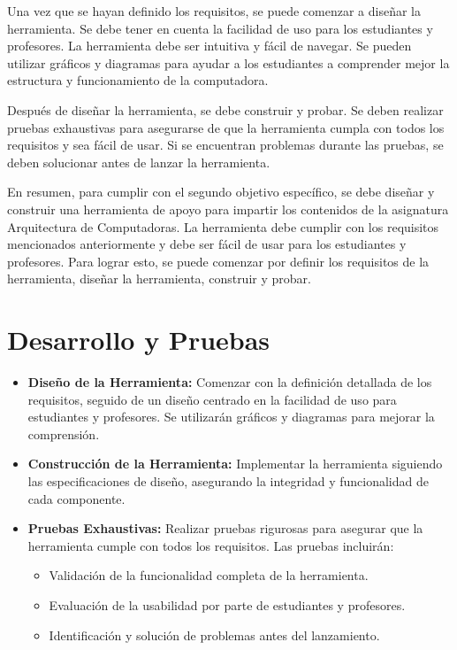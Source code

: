 \documentclass[12pt,twoside]{templates/unerthesis}
\providecommand{\tightlist}{%
  \setlength{\itemsep}{0pt}\setlength{\parskip}{0pt}}
\begin{document}
Una vez que se hayan definido los requisitos, se puede comenzar a diseñar la herramienta. Se debe tener en cuenta la facilidad de uso para los estudiantes y profesores. La herramienta debe ser intuitiva y fácil de navegar. Se pueden utilizar gráficos y diagramas para ayudar a los estudiantes a comprender mejor la estructura y funcionamiento de la computadora.

Después de diseñar la herramienta, se debe construir y probar. Se deben realizar pruebas exhaustivas para asegurarse de que la herramienta cumpla con todos los requisitos y sea fácil de usar. Si se encuentran problemas durante las pruebas, se deben solucionar antes de lanzar la herramienta.

En resumen, para cumplir con el segundo objetivo específico, se debe diseñar y construir una herramienta de apoyo para impartir los contenidos de la asignatura Arquitectura de Computadoras. La herramienta debe cumplir con los requisitos mencionados anteriormente y debe ser fácil de usar para los estudiantes y profesores. Para lograr esto, se puede comenzar por definir los requisitos de la herramienta, diseñar la herramienta, construir y probar.

\hypertarget{desarrollo-y-pruebas}{%
\section{Desarrollo y Pruebas}\label{desarrollo-y-pruebas}}

\begin{itemize}
\item
  \textbf{Diseño de la Herramienta:} Comenzar con la definición detallada de los requisitos, seguido de un diseño centrado en la facilidad de uso para estudiantes y profesores. Se utilizarán gráficos y diagramas para mejorar la comprensión.
\item
  \textbf{Construcción de la Herramienta:} Implementar la herramienta siguiendo las especificaciones de diseño, asegurando la integridad y funcionalidad de cada componente.
\item
  \textbf{Pruebas Exhaustivas:} Realizar pruebas rigurosas para asegurar que la herramienta cumple con todos los requisitos. Las pruebas incluirán:

  \begin{itemize}
  \tightlist
  \item
    Validación de la funcionalidad completa de la herramienta.
  \item
    Evaluación de la usabilidad por parte de estudiantes y profesores.
  \item
    Identificación y solución de problemas antes del lanzamiento.
  \end{itemize}
\end{itemize}
\end{document}
